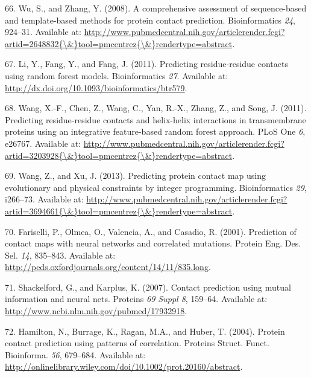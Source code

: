 \documentclass[11pt,a4paper,twoside]{book}
\theoremstyle{definition}
\theoremstyle{definition}
\theoremstyle{remark}
\begin{document}
\hypertarget{ref-Wu2008}{}
66. Wu, S., and Zhang, Y. (2008). A comprehensive assessment of
sequence-based and template-based methods for protein contact
prediction. Bioinformatics \emph{24}, 924--31. Available at:
\href{http://www.pubmedcentral.nih.gov/articlerender.fcgi?artid=2648832\%7B/\&\%7Dtool=pmcentrez\%7B/\&\%7Drendertype=abstract}{http://www.pubmedcentral.nih.gov/articlerender.fcgi?artid=2648832\{\textbackslash{}\&\}tool=pmcentrez\{\textbackslash{}\&\}rendertype=abstract}.

\hypertarget{ref-Li2011}{}
67. Li, Y., Fang, Y., and Fang, J. (2011). Predicting residue-residue
contacts using random forest models. Bioinformatics \emph{27}. Available
at: \url{http://dx.doi.org/10.1093/bioinformatics/btr579}.

\hypertarget{ref-Wang2011}{}
68. Wang, X.-F., Chen, Z., Wang, C., Yan, R.-X., Zhang, Z., and Song, J.
(2011). Predicting residue-residue contacts and helix-helix interactions
in transmembrane proteins using an integrative feature-based random
forest approach. PLoS One \emph{6}, e26767. Available at:
\href{http://www.pubmedcentral.nih.gov/articlerender.fcgi?artid=3203928\%7B/\&\%7Dtool=pmcentrez\%7B/\&\%7Drendertype=abstract}{http://www.pubmedcentral.nih.gov/articlerender.fcgi?artid=3203928\{\textbackslash{}\&\}tool=pmcentrez\{\textbackslash{}\&\}rendertype=abstract}.

\hypertarget{ref-Wang2013}{}
69. Wang, Z., and Xu, J. (2013). Predicting protein contact map using
evolutionary and physical constraints by integer programming.
Bioinformatics \emph{29}, i266--73. Available at:
\href{http://www.pubmedcentral.nih.gov/articlerender.fcgi?artid=3694661\%7B/\&\%7Dtool=pmcentrez\%7B/\&\%7Drendertype=abstract}{http://www.pubmedcentral.nih.gov/articlerender.fcgi?artid=3694661\{\textbackslash{}\&\}tool=pmcentrez\{\textbackslash{}\&\}rendertype=abstract}.

\hypertarget{ref-Fariselli2001a}{}
70. Fariselli, P., Olmea, O., Valencia, A., and Casadio, R. (2001).
Prediction of contact maps with neural networks and correlated
mutations. Protein Eng. Des. Sel. \emph{14}, 835--843. Available at:
\url{http://peds.oxfordjournals.org/content/14/11/835.long}.

\hypertarget{ref-Shackelford2007}{}
71. Shackelford, G., and Karplus, K. (2007). Contact prediction using
mutual information and neural nets. Proteins \emph{69 Suppl 8}, 159--64.
Available at: \url{http://www.ncbi.nlm.nih.gov/pubmed/17932918}.

\hypertarget{ref-Hamilton2004a}{}
72. Hamilton, N., Burrage, K., Ragan, M.A., and Huber, T. (2004).
Protein contact prediction using patterns of correlation. Proteins
Struct. Funct. Bioinforma. \emph{56}, 679--684. Available at:
\url{http://onlinelibrary.wiley.com/doi/10.1002/prot.20160/abstract}.
\end{document}
